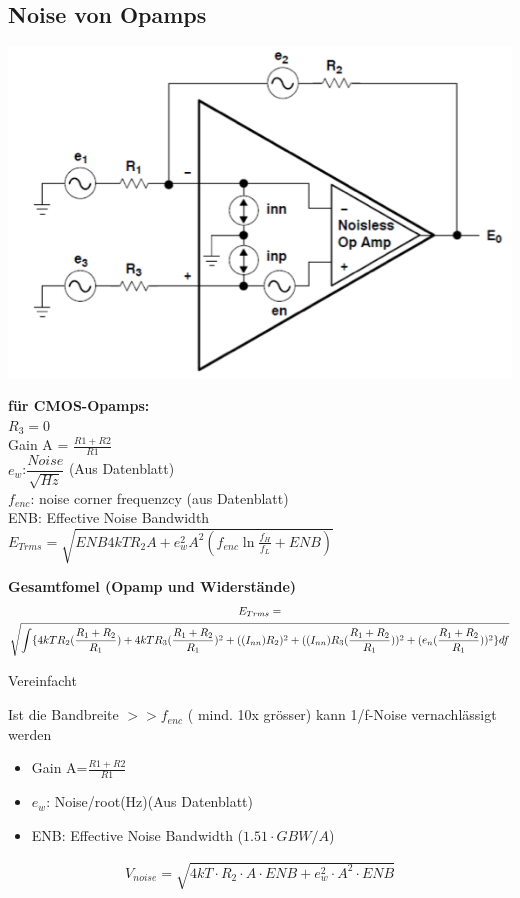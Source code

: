 \subsection{Noise von Opamps}
\begin{multicols}{2}
	\includegraphics[scale=0.4]{pictures/oampnoise}
	\columnbreak
	
	\textbf{für CMOS-Opamps:} \\
	$R_3=0$ \\
	Gain A = $\frac{R1+R2}{R1}$ \\
	$e_{w}$:$\dfrac{Noise}{\sqrt{Hz}}$ (Aus Datenblatt) \\
	$f_{enc}$: noise corner frequenzcy (aus Datenblatt) \\
	ENB: Effective Noise Bandwidth \\
	$E_{Trms}=\sqrt{ENB4kTR_{2}A+e_{w}^2A^2(f_{enc}\ln{\frac{f_{H}}{f_{L}}}+ENB)}$
\end{multicols}

\textbf{Gesamtfomel (Opamp und Widerstände)}\\
\begin{gather*}
E_{Trms}=\notag\\\sqrt{\int
\{4kTR_{2}(\frac{R_{1}+R_{2}}{R_{1}})+4kTR_{3}(\frac{R_{1}+R_{2}}{R_{1}})^2+((I_{nn})R_{2})^2+((I_{nn})R_{3}(\frac{R_{1}+R_{2}}{R_{1}}))^2+(e_{n}(\frac{R_{1}+R_{2}}{R_{1}}))^2\}df}
\end{gather*}


Vereinfacht 


Ist die Bandbreite $>>f_{enc}$ ( mind. 10x grösser) kann 1/f-Noise
vernachlässigt werden
\begin{itemize}
  \item Gain A=$\frac{R1+R2}{R1}$
  \item $e_{w}$: Noise/root(Hz)(Aus Datenblatt)
  \item ENB: Effective Noise Bandwidth ($1.51 \cdot GBW/A$)
\end{itemize}
\begin{gather*}
V_{noise}=\sqrt{4kT \cdot R_{2} \cdot A \cdot ENB+e_{w}^2 \cdot A^2 \cdot ENB}
\end{gather*}
